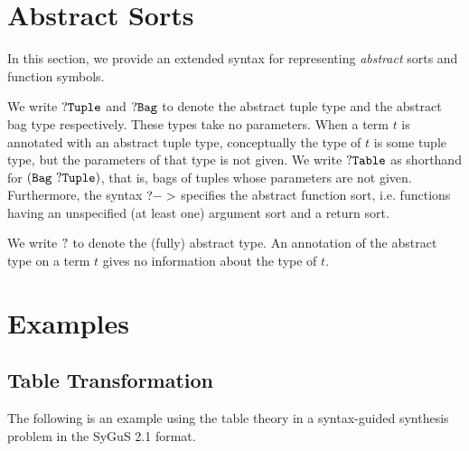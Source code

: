 \documentclass[english,a4paper,10pt]{article}
\begin{document}
\section{Abstract Sorts}

In this section, we provide an extended syntax for representing
\emph{abstract} sorts and function symbols.

We write
${\tt ?Tuple}$ and ${\tt ?Bag}$
to denote the abstract tuple type and the abstract bag type respectively.
These types take no parameters.
When a term $t$ is annotated with an abstract tuple type,
conceptually the type of $t$ is some tuple type,
but the parameters of that type is not given.
We write ${\tt ?Table}$ as shorthand for $\syntax{( Bag\ \abstype{Tuple})}$,
that is, bags of tuples whose parameters are not given.
Furthermore, 
the syntax ${\tt ?->}$ specifies the abstract function sort,
i.e. functions having an unspecified (at least one) argument sort and a return sort.

We write ${\tt ?}$ to denote
the (fully) abstract type.
An annotation of the abstract type on a term $t$ gives no information about the type of $t$.

\section{Examples}

\subsection{Table Transformation}
The following is an example using the table theory in a syntax-guided synthesis problem
in the SyGuS 2.1 format.
\end{document}
